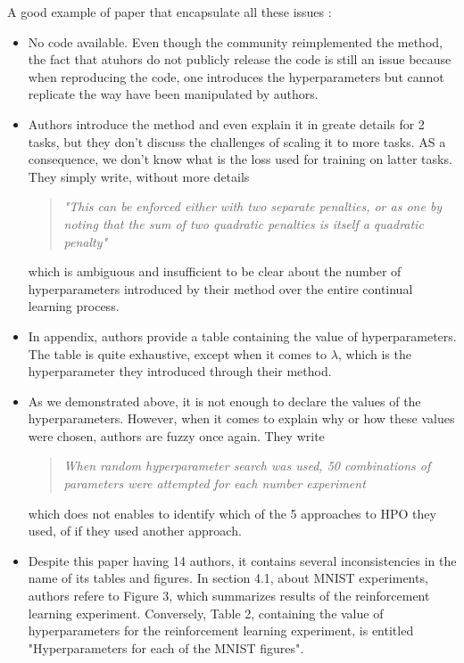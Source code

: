 \documentclass[11pt]{article}
\begin{document}
A good example of paper that encapsulate all these issues :
\begin{itemize}
    \item No code available. Even though the community reimplemented the method, the fact that atuhors do not publicly release the code is still an issue because when reproducing the code, one introduces the hyperparameters but cannot replicate the way have been manipulated by authors.
    \item Authors introduce the method and even explain it in greate details \cite{EWC_nuts_and_bolts} for 2 tasks, but they don't discuss the challenges of scaling it to more tasks. AS a consequence, we don't know what is the loss used for training on latter tasks. They simply write, without more details
    \begin{quote}
        \itshape
        "This can be enforced either with two separate penalties, or as one by noting that the sum of two quadratic penalties is itself a quadratic penalty"
    \end{quote}
    which is ambiguous and insufficient to be clear about the number of hyperparameters introduced by their method over the entire continual learning process.
    \item In appendix, authors provide a table containing the value of hyperparameters. The table is quite exhaustive, except when it comes to $\lambda$, which is the hyperparameter they introduced through their method.
    \item As we demonstrated above, it is not enough to declare the values of the hyperparameters. However, when it comes to explain why or how these values were chosen, authors are fuzzy once again. They write
    \begin{quote}
        \itshape
        When random hyperparameter search was used, 50 combinations of parameters were attempted for each number experiment
    \end{quote}
    which does not enables to identify which of the 5 approaches to HPO they used, of if they used another approach.
    \item Despite this paper having 14 authors, it contains several inconsistencies in the name of its tables and figures. In section 4.1, about MNIST experiments, authors refere to Figure 3, which summarizes results of the reinforcement learning experiment. Conversely, Table 2, containing the value of hyperparameters for the reinforcement learning experiment, is entitled "Hyperparameters for each of the MNIST figures".
\end{itemize}
\end{document}
